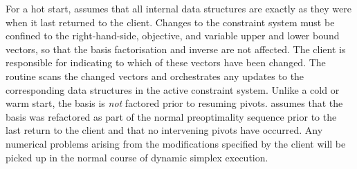 For a hot start, \dylp assumes that all internal data structures are exactly as
they were when it last returned to the client.
Changes to the constraint system must be confined to the
right-hand-side, objective, and variable upper and lower bound vectors,
so that the basis factorisation and inverse are not affected.
The client is responsible for indicating to \dylp which of these vectors have
been changed.
The routine  scans the changed vectors and orchestrates
any updates to the corresponding data structures in the active constraint
system.
Unlike a cold or warm start, the basis is \textit{not} factored prior to
resuming pivots.
\dylp assumes that the basis was refactored as part of the normal preoptimality
sequence prior to the last return to the client and that no intervening
pivots have occurred.
Any numerical problems arising from the modifications specified by the
client will be picked up in the normal course of dynamic simplex execution.

